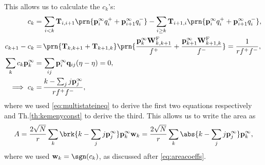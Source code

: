 \documentclass[12pt]{article}
\newcommand{\eq}{\mathbf{p}^\infty}
\newcommand{\fpt}{\mathbf{T}}
\newcommand{\w}{\mathbf{w}}
\newcommand{\W}{\mathbf{W}}
\newcommand{\enc}{\mathbf{q}}
\newcommand{\frg}{\W^{\mathrm{F}}}
\begin{document}
This allows us to calculate the $c_k$'s:
%
\begin{equation}\label{eq:areacoeffchain}
\begin{aligned}
  c_k =&\, \sum_{i<k} \fpt_{i,i+1} \prn{\eq_{i}q^+_i+\eq_{i+1}q^-_i}
    - \sum_{i\geq k} \fpt_{i+1,i} \prn{\eq_{i}q^+_i+\eq_{i+1}q^-_i}
  ,\\
  c_{k+1} - c_k =&\, \prn{\fpt_{k,k+1}+\fpt_{k+1,k}} \prn{\frac{\eq_{k}\frg_{k,k+1}}{f^+}+\frac{\eq_{k+1}\frg_{k+1,k}}{f^-}}
    =%
    \frac{1}{rf^+f^-},\\
  \sum_k c_k \eq_k =&\, \sum_{ij} \eq_i \enc_{ij} (\eta-\eta) = 0,\\
  \implies c_k =&\, \frac{k - \sum_j j\eq_j}{rf^+f^-},
\end{aligned}
\end{equation}
%
where we used \eqref{eq:multistateineq} to derive the first two equations respectively and Th.\ref{th:kemenyconst} to derive the third. This allows us to write the area as
%
\begin{equation}\label{eq:multistatearea}
  A = \frac{2\sqrt{N}}{r} \sum_k \brk{k - \sum_j j\eq_j} \eq_k \w_k
    = \frac{2\sqrt{N}}{r} \sum_k \abs{k - \sum_j j\eq_j} \eq_k ,
\end{equation}
%
where we used $\w_k=\sgn(c_k)$, as discussed after \eqref{eq:areacoeffs}.
%
\end{document}
